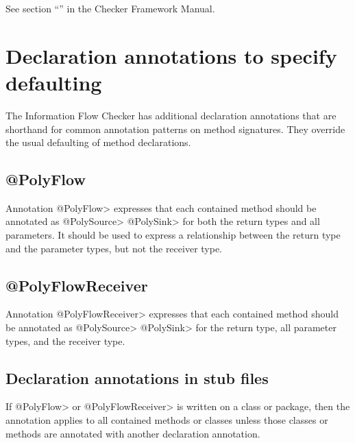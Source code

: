 See section ``'' in the Checker Framework Manual.  




\section{Declaration annotations to specify defaulting\label{sec:addtionalanno}}

The Information Flow Checker has additional declaration annotations that are shorthand for common 
annotation patterns on method signatures.   They override the usual defaulting of method declarations.

\subsection{@PolyFlow\label{sec:polyflow}}

Annotation \<@PolyFlow> expresses that each contained method should be annotated as \<@PolySource> 
\<@PolySink> for both the return types and all parameters. It should be used to express a relationship 
between the return type and the parameter types, but not the receiver type.


\subsection{@PolyFlowReceiver\label{sec:polyflowreceiver}}

Annotation \<@PolyFlowReceiver> expresses that each contained method should be annotated as \<@PolySource> \<@PolySink> for the return type, all parameter types, and the receiver type.

\subsection{Declaration annotations in stub files\label{sec:declannosstubfiles}}
If \<@PolyFlow> or \<@PolyFlowReceiver> is written on a class or package, then the annotation applies
 to all contained methods or classes unless those classes or methods are annotated with another 
 declaration annotation.   

